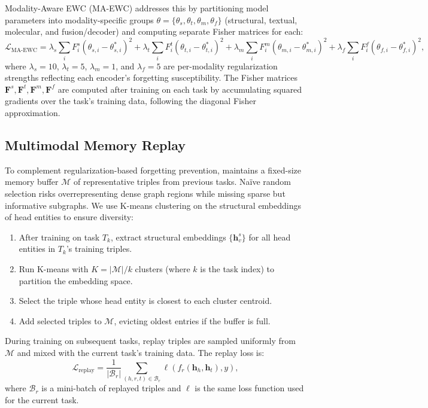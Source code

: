 Modality-Aware EWC (MA-EWC) addresses this by partitioning model parameters into modality-specific groups $\theta = \{\theta_s, \theta_t, \theta_m, \theta_f\}$ (structural, textual, molecular, and fusion/decoder) and computing separate Fisher matrices for each:
\begin{equation}
    \mathcal{L}_{\text{MA-EWC}} = \lambda_s \sum_i F_i^s (\theta_{s,i} - \theta_{s,i}^*)^2 + \lambda_t \sum_i F_i^t (\theta_{t,i} - \theta_{t,i}^*)^2 + \lambda_m \sum_i F_i^m (\theta_{m,i} - \theta_{m,i}^*)^2 + \lambda_f \sum_i F_i^f (\theta_{f,i} - \theta_{f,i}^*)^2,
    \label{eq:maewc}
\end{equation}
where $\lambda_s{=}10$, $\lambda_t{=}5$, $\lambda_m{=}1$, and $\lambda_f{=}5$ are per-modality regularization strengths reflecting each encoder's forgetting susceptibility.
The Fisher matrices $\mathbf{F}^s, \mathbf{F}^t, \mathbf{F}^m, \mathbf{F}^f$ are computed after training on each task by accumulating squared gradients over the task's training data, following the diagonal Fisher approximation.

\subsection{Multimodal Memory Replay}
\label{subsec:replay}

To complement regularization-based forgetting prevention, \ours maintains a fixed-size memory buffer $\mathcal{M}$ of representative triples from previous tasks.
Na\"ive random selection risks overrepresenting dense graph regions while missing sparse but informative subgraphs.
We use K-means clustering on the structural embeddings of head entities to ensure diversity:
\begin{enumerate}
    \item After training on task $T_k$, extract structural embeddings $\{\mathbf{h}_v^s\}$ for all head entities in $T_k$'s training triples.
    \item Run K-means with $K = |\mathcal{M}| / k$ clusters (where $k$ is the task index) to partition the embedding space.
    \item Select the triple whose head entity is closest to each cluster centroid.
    \item Add selected triples to $\mathcal{M}$, evicting oldest entries if the buffer is full.
\end{enumerate}
During training on subsequent tasks, replay triples are sampled uniformly from $\mathcal{M}$ and mixed with the current task's training data.
The replay loss is:
\begin{equation}
    \mathcal{L}_{\text{replay}} = \frac{1}{|\mathcal{B}_r|} \sum_{(h,r,t) \in \mathcal{B}_r} \ell(f_r(\mathbf{h}_h, \mathbf{h}_t), y),
    \label{eq:replay}
\end{equation}
where $\mathcal{B}_r$ is a mini-batch of replayed triples and $\ell$ is the same loss function used for the current task.

